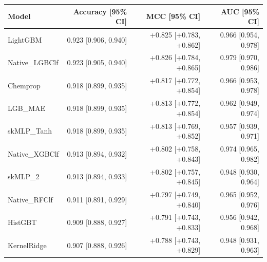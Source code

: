 \begin{tabular}{lrrr}
\toprule
Model & Accuracy [95\% CI] & MCC [95\% CI] & AUC [95\% CI] \\
\midrule
LightGBM & 0.923 [0.906, 0.940] & +0.825 [+0.783, +0.862] & 0.966 [0.954, 0.978] \\
Native\_LGBClf & 0.923 [0.905, 0.940] & +0.826 [+0.784, +0.865] & 0.979 [0.970, 0.986] \\
Chemprop & 0.918 [0.899, 0.935] & +0.817 [+0.772, +0.854] & 0.966 [0.953, 0.978] \\
LGB\_MAE & 0.918 [0.899, 0.935] & +0.813 [+0.772, +0.854] & 0.962 [0.949, 0.974] \\
skMLP\_Tanh & 0.918 [0.899, 0.935] & +0.813 [+0.769, +0.852] & 0.957 [0.939, 0.971] \\
Native\_XGBClf & 0.913 [0.894, 0.932] & +0.802 [+0.758, +0.843] & 0.974 [0.965, 0.982] \\
skMLP\_2 & 0.913 [0.894, 0.933] & +0.802 [+0.757, +0.845] & 0.948 [0.930, 0.964] \\
Native\_RFClf & 0.911 [0.891, 0.929] & +0.797 [+0.749, +0.840] & 0.965 [0.952, 0.976] \\
HistGBT & 0.909 [0.888, 0.927] & +0.791 [+0.743, +0.833] & 0.956 [0.942, 0.968] \\
KernelRidge & 0.907 [0.888, 0.926] & +0.788 [+0.743, +0.829] & 0.948 [0.931, 0.963] \\
\bottomrule
\end{tabular}